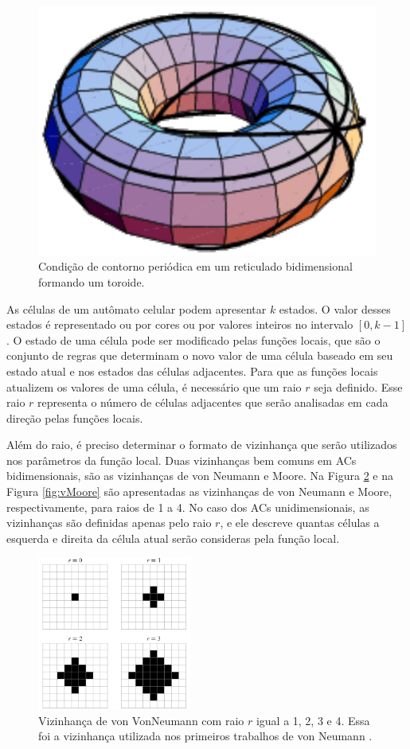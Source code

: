 \documentclass[12pt,a4paper]{article}
\begin{document}
	\begin{figure}[h!]
	  \centering
	  \includegraphics[width=.5\textwidth]{fig_toro.pdf}
	  \caption{Condição de contorno periódica em um reticulado bidimensional formando um toroide.}
	  \label{fig:toro}
	\end{figure}

As células de um autômato celular podem apresentar $k$ estados. O valor desses estados é representado ou por cores ou por valores inteiros no intervalo $[0, k-1]$. O estado de uma célula pode ser modificado pelas funções locais, que são o conjunto de regras que determinam o novo valor de uma célula baseado em seu estado atual e nos estados das células adjacentes. Para que as funções locais atualizem os valores de uma célula, é necessário que um raio $r$ seja definido. Esse raio $r$ representa o número de células adjacentes que serão analisadas em cada direção pelas funções locais.

Além do raio, é preciso determinar o formato de vizinhança que serão utilizados nos parâmetros da função local. Duas vizinhanças bem comuns em ACs bidimensionais, são as vizinhanças de von Neumann e Moore. Na Figura \ref{fig:vVonNeumann} e na Figura \ref{fig:vMoore} são apresentadas as vizinhanças de von Neumann e Moore, respectivamente, para raios de 1 a 4. No caso dos ACs unidimensionais, as vizinhanças são definidas apenas pelo raio $r$, e ele descreve quantas células a esquerda e direita da célula atual serão consideras pela função local.
	\begin{figure}[h!]
	  \centering
	  \includegraphics[width=0.45\textwidth]{fig_vVonNeumann.png}
	  \caption{Vizinhança de von VonNeumann com raio $r$ igual a 1, 2, 3 e 4. Essa foi a vizinhança utilizada nos primeiros trabalhos de von Neumann \cite{weisstein2015b}.}
	  \label{fig:vVonNeumann}
	\end{figure}
\end{document}
